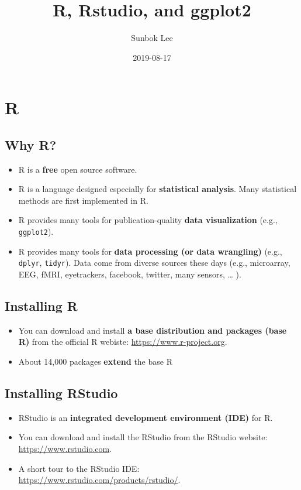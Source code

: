 \documentclass[]{book}
\title{R, Rstudio, and ggplot2}
\author{Sunbok Lee}
\date{2019-08-17}
\providecommand{\tightlist}{%
  \setlength{\itemsep}{0pt}\setlength{\parskip}{0pt}}
\begin{document}
\maketitle

{
\setcounter{tocdepth}{1}
\tableofcontents
}
\chapter{R}\label{r}

\section{Why R?}\label{why-r}

\begin{itemize}
\tightlist
\item
  R is a \textbf{free} open source software.
\item
  R is a language designed especially for \textbf{statistical analysis}.
  Many statistical methods are first implemented in R.
\item
  R provides many tools for publication-quality \textbf{data
  visualization} (e.g., \texttt{ggplot2}).
\item
  R provides many tools for \textbf{data processing (or data wrangling)}
  (e.g., \texttt{dplyr}, \texttt{tidyr}). Data come from diverse sources
  these days (e.g., microarray, EEG, fMRI, eyetrackers, facebook,
  twitter, many sensors, \ldots{} ).
\end{itemize}

\section{Installing R}\label{installing-r}

\begin{itemize}
\item
  You can download and install \textbf{a base distribution and packages
  (base R)} from the official R webiste:
  \url{https://www.r-project.org}.
\item
  About 14,000 packages \textbf{extend} the base R
\end{itemize}

\section{Installing RStudio}\label{installing-rstudio}

\begin{itemize}
\item
  RStudio is an \textbf{integrated development environment (IDE)} for R.
\item
  You can download and install the RStudio from the RStudio website:
  \url{https://www.rstudio.com}.
\item
  A short tour to the RStudio IDE:
  \url{https://www.rstudio.com/products/rstudio/}.
\end{itemize}
\end{document}
